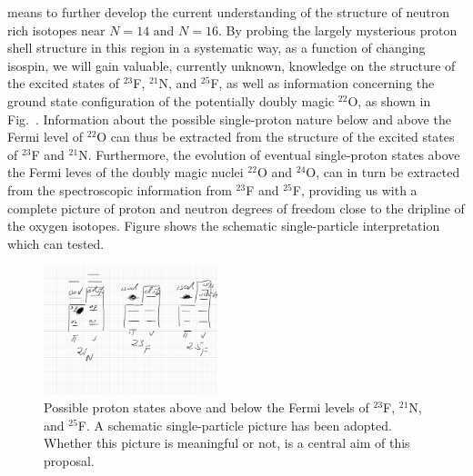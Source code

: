 \documentclass[prc,preprint,superscriptaddress,showpacs,floatfix]{revtex4-1}
\begin{document}
means to further develop the current understanding of the structure of
neutron rich isotopes near $N=14$ and $N=16$. By probing the largely
mysterious proton shell structure in this region in a systematic way,
as a function of changing isospin, we will gain valuable, currently
unknown, knowledge on the structure of the excited states of $^{23}$F,
$^{21}$N, and $^{25}$F, as well as information concerning the ground
state configuration of the potentially doubly magic $^{22}$O, as shown
in Fig.~\cite{fig:simplemodels}.  Information about the possible
single-proton nature below and above the Fermi level of $^{22}$O can
thus be extracted from the structure of the excited states of $^{23}$F
and $^{21}$N. Furthermore, the evolution of eventual single-proton
states above the Fermi leves of the doubly magic nuclei $^{22}$O and
$^{24}$O, can in turn be extracted from the spectroscopic information
from $^{23}$F and $^{25}$F, providing us with a complete picture of
proton and neutron degrees of freedom close to the dripline of the
oxygen isotopes. Figure \cite{fig:simplemodels} shows the schematic
single-particle interpretation which can tested.
\begin{figure}
       \begin{center}
		\includegraphics[width=0.45\textwidth, clip]{schematic.pdf}
	\end{center}
\caption{Possible proton states above and below the Fermi levels of  $^{23}$F, $^{21}$N, and $^{25}$F. A schematic single-particle picture has been adopted. Whether this picture is meaningful or not, is a central aim of this proposal.} \label{fig:simplemodels}
\end{figure}
\end{document}
